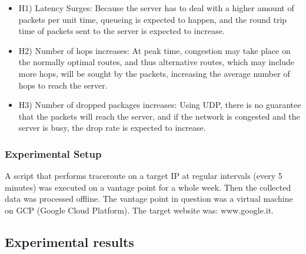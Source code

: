 \documentclass[a4paper,10pt]{article}
\begin{document}
\begin{itemize}

\item H1) Latency Surges: Because the server has to deal with a higher amount of packets per unit time, queueing is expected to happen, and the round trip time of packets sent to the server is expected to increase.

\item H2) Number of hops increases: At peak time, congestion may take place on the normally optimal routes, and thus alternative routes, which may include more hops, will be sought by the packets, increasing the average number of hops to reach the server.

\item H3) Number of dropped packages increases: Using UDP, there is no guarantee that the packets will reach the server, and if the network is congested and the server is busy, the drop rate is expected to increase.

\end{itemize}


\maketitle
\subsubsection{Experimental Setup}

A script that performs traceroute on a target IP at regular intervals (every 5 minutes) was executed on a vantage point for a whole week. Then the collected data was processed offline. The vantage point in question was a virtual machine on GCP (Google Cloud Platform). The target website was: www.google.it.

\subsection{Experimental results}
\end{document}
